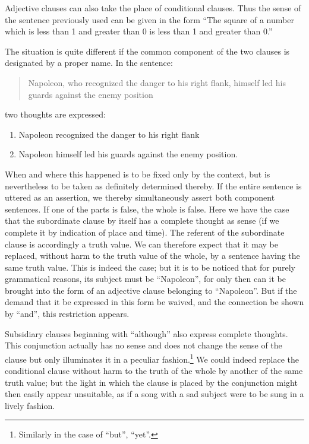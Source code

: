 \documentclass[twoside,12pt]{article}
\begin{document}
Adjective clauses can also take the place of conditional clauses. Thus
the sense of the sentence previously used can be given in the form
``The square of a number which is less than 1 and greater than 0 is
less than 1 and greater than 0.''

The situation is quite different if the common component of the two
clauses is designated by a proper name. In the sentence:

\begin{quote}
  Napoleon, who recognized the danger to his right flank, himself led
  his guards against the enemy position
\end{quote}

\noindent two thoughts are expressed:

\begin{enumerate}
\item Napoleon recognized the danger to his right flank
\item Napoleon himself led his guards against the enemy position.
\end{enumerate}

\noindent When and where this happened is to be fixed only by the
context, but is nevertheless to be taken as definitely determined
thereby. If the entire sentence is uttered as an assertion, we thereby
simultaneously assert both component sentences. If one of the parts is
false, the whole is false. Here we have the case that the subordinate
clause by itself has a complete thought as sense (if we complete it by
indication of place and time). The referent of the subordinate clause
is accordingly a truth value. We can therefore expect that it may be
replaced, without harm to the truth value of the whole, by a sentence
having the  same truth value. This is indeed the case;
but it is to be noticed that for purely grammatical reasons, its
subject must be ``Napoleon'', for only then can it be brought into the
form of an adjective clause belonging to ``Napoleon''. But if the
demand that it be expressed in this form be waived, and the connection
be shown by ``and'', this restriction appears.

Subsidiary clauses beginning with ``although'' also express complete
thoughts. This conjunction actually has no sense and does not change
the sense of the clause but only illuminates it in a peculiar
fashion.\footnote[12]{Similarly in the case of ``but'', ``yet''.} We
could indeed replace the conditional clause without harm to the truth
of the whole by another of the same truth value; but the light in
which the clause is placed by the conjunction might then easily appear
unsuitable, as if a song with a sad subject were to be sung in a
lively fashion.
\end{document}
